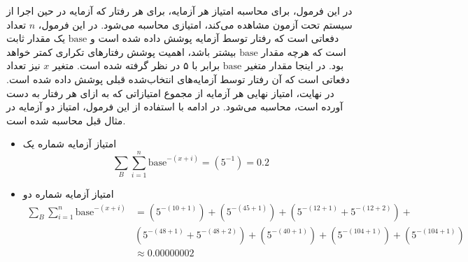 \begin{itemize}
در این فرمول، برای محاسبه امتیاز هر آزمایه، برای هر رفتار  که آزمایه در حین اجرا از سیستم تحت آزمون مشاهده می‌کند، امتیازی محاسبه می‌شود. در این فرمول، \( n \) تعداد دفعاتی است که رفتار توسط آزمایه پوشش داده شده است و \( \text{base} \) یک مقدار ثابت است که هرچه مقدار \( \text{base} \) بیشتر باشد، اهمیت پوشش رفتارهای تکراری کمتر خواهد بود. در اینجا مقدار متغیر \( \text{base} \) برابر با ۵ در نظر گرفته شده است. متغیر \( x \) نیز تعداد دفعاتی است که آن رفتار توسط آزمایه‌های انتخاب‌شده قبلی پوشش داده شده است. در نهایت، امتیاز نهایی هر آزمایه از مجموع امتیازاتی که به ازای هر رفتار به دست آورده است، محاسبه می‌شود. در ادامه با استفاده از این فرمول، امتیاز دو آزمایه در مثال قبل محاسبه شده است.

\begin{itemize}
	\item امتیاز آزمایه شماره یک
	\[ \sum_{B} \sum_{i=1}^{n} \text{base}^{-(x+i)} = (5^{-1}) = 0.2 \]
	\item امتیاز آزمایه شماره دو
	\begin{align*}
		\sum_{B} \sum_{i=1}^{n} \text{base}^{-(x+i)} & = (5^{-(10+1)}) + (5^{-(45+1)}) + (5^{-(12+1)} + 5^{-(12+2)})  + \\
		& (5^{-(48+1)} + 5^{-(48+2)}) + (5^{-(40+1)}) + (5^{-(104+1)}) + (5^{-(104+1)}) \\
		& \approx 0.00000002
	\end{align*}
\end{itemize}

\end{itemize}

